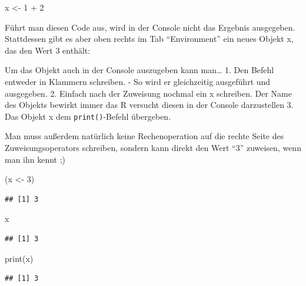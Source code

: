 \documentclass[
]{book}
\newenvironment{Shaded}{\begin{snugshade}}{\end{snugshade}}
\newcommand{\DecValTok}[1]{\textcolor[rgb]{0.00,0.00,0.81}{#1}}
\newcommand{\FunctionTok}[1]{\textcolor[rgb]{0.00,0.00,0.00}{#1}}
\newcommand{\NormalTok}[1]{#1}
\newcommand{\OtherTok}[1]{\textcolor[rgb]{0.56,0.35,0.01}{#1}}
\newcommand{\SpecialCharTok}[1]{\textcolor[rgb]{0.00,0.00,0.00}{#1}}
\begin{document}
\begin{Shaded}
\begin{Highlighting}[]
\NormalTok{x }\OtherTok{\textless{}{-}} \DecValTok{1} \SpecialCharTok{+} \DecValTok{2}
\end{Highlighting}
\end{Shaded}

Führt man diesen Code aus, wird in der Console nicht das Ergebnis ausgegeben. Stattdessen gibt es aber oben rechts im Tab ``Environment'' ein neues Objekt x, das den Wert 3 enthält:

Um das Objekt auch in der Console auszugeben kann man\ldots{}
1. Den Befehl entweder in Klammern schreiben. - So wird er gleichzeitig ausgeführt und ausgegeben.
2. Einfach nach der Zuweisung nochmal ein x schreiben. Der Name des Objekts bewirkt immer das R versucht diesen in der Console darzustellen
3. Das Objekt x dem \texttt{print()}-Befehl übergeben.

Man muss außerdem natürlich keine Rechenoperation auf die rechte Seite des Zuweisungsoperators schreiben, sondern kann direkt den Wert ``3'' zuweisen, wenn man ihn kennt ;)

\begin{Shaded}
\begin{Highlighting}[]
\NormalTok{(x }\OtherTok{\textless{}{-}} \DecValTok{3}\NormalTok{)}
\end{Highlighting}
\end{Shaded}

\begin{verbatim}
## [1] 3
\end{verbatim}

\begin{Shaded}
\begin{Highlighting}[]
\NormalTok{x}
\end{Highlighting}
\end{Shaded}

\begin{verbatim}
## [1] 3
\end{verbatim}

\begin{Shaded}
\begin{Highlighting}[]
\FunctionTok{print}\NormalTok{(x)}
\end{Highlighting}
\end{Shaded}

\begin{verbatim}
## [1] 3
\end{verbatim}
\end{document}
